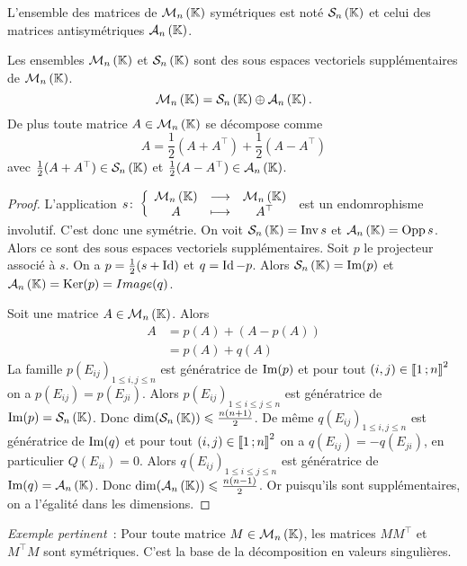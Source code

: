 L'ensemble des matrices de \(\mathcal{M}_{n}\left(\mathbb{K}\right)\) symétriques est noté \(\mathcal{S}_{n}\left(\mathbb{K}\right)\) et celui des matrices antisymétriques \(\mathcal{A}_{n}\left(\mathbb{K}\right)\).

\begin{theo}
  Les ensembles \(\mathcal{M}_{n}\left(\mathbb{K}\right)\) et \(\mathcal{S}_{n}\left(\mathbb{K}\right)\) sont des sous espaces vectoriels supplémentaires de \(\mathcal{M}_{n}\left(\mathbb{K}\right)\).
  \begin{equation}
    \mathcal{M}_{n}\left(\mathbb{K}\right)=\mathcal{S}_{n}\left(\mathbb{K}\right) \oplus \mathcal{A}_{n}\left(\mathbb{K}\right).
  \end{equation}
  De plus toute matrice \(A \in \mathcal{M}_{n}\left(\mathbb{K}\right)\) se décompose comme
  \begin{equation}
    A = \frac{1}{2} (A+A^\top) + \frac{1}{2} (A-A^\top)
  \end{equation}
  avec \(\frac{1}{2} (A+A^\top) \in \mathcal{S}_{n}\left(\mathbb{K}\right)\) et \(\frac{1}{2} (A-A^\top) \in \mathcal{A}_{n}\left(\mathbb{K}\right)\).
\end{theo}
\begin{proof}
  L'application \(s\colon \left\{\begin{array}{ccc} \mathcal{M}_{n}\left(\mathbb{K}\right) & \longrightarrow &\mathcal{M}_{n}\left(\mathbb{K}\right)\\ A & \longmapsto & A^\top \end{array} \right.\) est un endomrophisme involutif. C'est donc une symétrie. On voit \(\mathcal{S}_{n}\left(\mathbb{K}\right)=\operatorname{Inv}{s}\) et \(\mathcal{A}_{n}\left(\mathbb{K}\right)=\operatorname{Opp}{s}\). Alors ce sont des sous espaces vectoriels supplémentaires. Soit \(p\) le projecteur associé à \(s\). On a \(p=\frac{1}{2}(s+\operatorname{Id})\) et \(q=\operatorname{Id}-p\). Alors \(\mathcal{S}_{n}\left(\mathbb{K}\right)=\operatorname{Im}(p)\) et \(\mathcal{A}_{n}\left(\mathbb{K}\right)=\operatorname{Ker}(p)=Image(q)\).

  Soit une matrice \(A \in \mathcal{M}_{n}\left(\mathbb{K}\right)\). Alors
  \begin{align}
    A&= p(A)+ (A-p(A))\\
     &= p(A)+q(A)
  \end{align}
  La famille \(p(E_{ij})_{1\leqslant i,j \leqslant n}\) est génératrice de \(\operatorname{Im}(p)\) et pour tout \((i,j) \in \mathopen{\llbracket}1\mathclose{}\mathpunct{};n\mathclose{\rrbracket}^2\) on a \(p(E_{ij})=p(E_{ji})\). Alors \(p(E_{ij})_{1\leqslant i \leqslant j \leqslant n}\) est génératrice de \(\operatorname{Im}(p)=\mathcal{S}_{n}\left(\mathbb{K}\right)\). Donc \(\dim(\mathcal{S}_{n}\left(\mathbb{K}\right)) \leqslant \frac{n(n+1)}{2}\). De même \(q(E_{ij})_{1\leqslant i,j \leqslant n}\) est génératrice de \(\operatorname{Im}(q)\) et pour tout \((i,j) \in \mathopen{\llbracket}1\mathclose{}\mathpunct{};n\mathclose{\rrbracket}^2\) on a \(q(E_{ij})=-q(E_{ji})\), en particulier \(Q(E_{ii})=0\). Alors \(q(E_{ij})_{1\leqslant i \leqslant j \leqslant n}\) est génératrice de \(\operatorname{Im}(q)=\mathcal{A}_{n}\left(\mathbb{K}\right)\). Donc \(\dim(\mathcal{A}_{n}\left(\mathbb{K}\right)) \leqslant \frac{n(n-1)}{2}\). Or puisqu'ils sont supplémentaires, on a l'égalité dans les dimensions.
\end{proof}

\emph{Exemple pertinent}~: Pour toute matrice \(M \in \mathcal{M}_{n}\left(\mathbb{K}\right)\), les matrices \(MM^\top\) et \(M^\top M\) sont symétriques. C'est la base de la décomposition en valeurs singulières.

